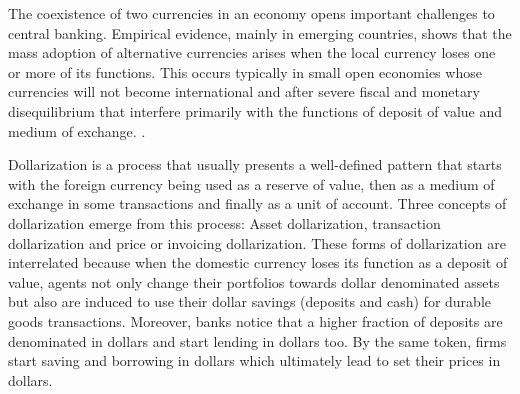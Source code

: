 
The coexistence of two currencies in an economy opens important challenges to central banking. Empirical evidence, mainly in emerging countries, shows that the mass adoption of alternative currencies arises when the local currency loses one or more of its functions. This occurs typically in small open economies whose currencies will not become international and after severe fiscal and monetary disequilibrium that interfere primarily with the functions of deposit of value and medium of exchange.  \citep{RePEc:imf:imfwpa:05/187}. 

Dollarization is a process that usually presents a well-defined pattern that starts with the foreign currency being used as a reserve of value, then as a medium of exchange in some transactions and finally as a unit of account. Three concepts of dollarization emerge from this process: Asset dollarization, transaction dollarization and price or invoicing dollarization. These forms of dollarization are interrelated because when the domestic currency loses its function as a deposit of value, agents not only change their portfolios towards dollar denominated assets but also are induced to use their dollar savings (deposits and cash) for durable goods transactions. Moreover, banks notice that a higher fraction of deposits are denominated in dollars and start lending in dollars too. By the same token, firms start saving and borrowing in dollars which ultimately lead to set their prices in dollars. 

